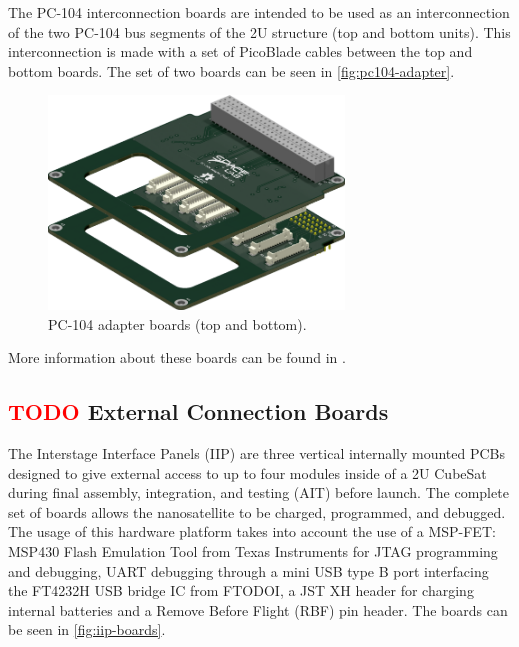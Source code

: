 The PC-104 interconnection boards are intended to be used as an interconnection of the two PC-104 bus segments of the 2U structure (top and bottom units). This interconnection is made with a set of PicoBlade cables between the top and bottom boards. The set of two boards can be seen in \autoref{fig:pc104-adapter}.

\begin{figure}[!ht]
    \begin{center}
        \includegraphics[width=0.7\textwidth]{figures/subsystems/pc104-adapter}
        \caption{PC-104 adapter boards (top and bottom).}
        \label{fig:pc104-adapter}
    \end{center}
\end{figure}

More information about these boards can be found in \cite{pc104-boards}.

\subsection{ \textcolor{red}{TODO} External Connection Boards}

The Interstage Interface Panels (IIP) are three vertical internally mounted PCBs designed to give external access to up to four modules inside of a 2U CubeSat during final assembly, integration, and testing (AIT) before launch. The complete set of boards allows the nanosatellite to be charged, programmed, and debugged. The usage of this hardware platform takes into account the use of a MSP-FET: MSP430 Flash Emulation Tool from Texas Instruments for JTAG programming and debugging, UART debugging through a mini USB type B port interfacing the FT4232H USB bridge IC from FTODOI, a JST XH header for charging internal batteries and a Remove Before Flight (RBF) pin header. The boards can be seen in \autoref{fig:iip-boards}.

